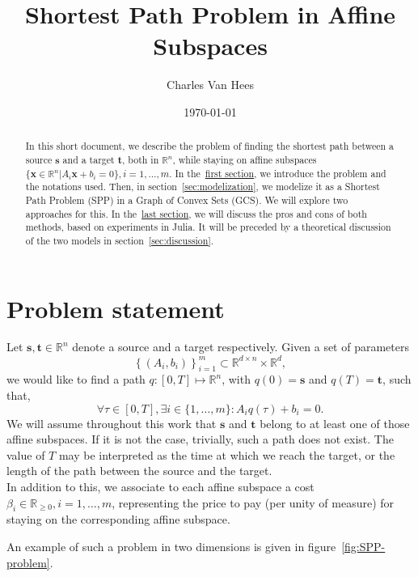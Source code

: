 \documentclass[a4paper, 12pt]{article}
\title{\vspace{-0.6cm}Shortest Path Problem in Affine Subspaces}
\author{Charles Van Hees}
\date{\today}
\newlength{\indentsize}
\begin{document}
\maketitle

\vspace{-0.9cm}
\begin{abstract}
    In this short document, we describe the problem of finding the shortest path between a source $\mathbf{s}$ and a target $\mathbf{t}$, both in $\mathbb{R}^n$, while staying on affine subspaces $\{\mathbf{x} \in \mathbb{R}^n \vert A_i \mathbf{x} + b_i = 0\}, i = 1, \dots, m$. In the~\hyperref[sec:statement]{first section}, we introduce the problem and the notations used. Then, in section~\ref{sec:modelization}, we modelize it as a Shortest Path Problem (SPP) in a Graph of Convex Sets (GCS). We will explore two approaches for this. In the~\hyperref[sec:experiments]{last section}, we will discuss the pros and cons of both methods, based on experiments in Julia. It will be preceded by a theoretical discussion of the two models in section~\ref{sec:discussion}.
\end{abstract}

\section{Problem statement}\label{sec:statement}
\hspace{\indentsize} Let $\mathbf{s}, \mathbf{t} \in \mathbb{R}^n$ denote a source and a target respectively. Given a set of parameters \[{\left\{(A_i, b_i)\right\}}_{i=1}^{m} \subset \mathbb{R}^{d \times n} \times \mathbb{R}^d,\] we would like to find a path $q : [0,T] \mapsto \mathbb{R}^n$, with $q(0) = \mathbf{s}$ and $q(T) = \mathbf{t}$, such that, \[\forall \tau \in [0,T], \exists i \in \{1, \dots, m\} : A_i q(\tau) + b_i = 0.\] We will assume throughout this work that $\mathbf{s}$ and $\mathbf{t}$ belong to at least one of those affine subspaces. If it is not the case, trivially, such a path does not exist. The value of $T$ may be interpreted as the time at which we reach the target, or the length of the path between the source and the target.\\
In addition to this, we associate to each affine subspace a cost $\beta_i \in \mathbb{R}_{\geq 0}, i = 1, \dots, m$, representing the price to pay (per unity of measure) for staying on the corresponding affine subspace.

An example of such a problem in two dimensions is given in figure~\ref{fig:SPP-problem}.
\end{document}
